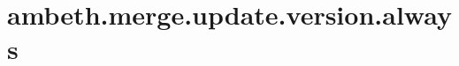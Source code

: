 \section{ambeth.merge.update.version.always}
\label{configuration:AmbethMergeUpdateVersionAlways}
\TODO
